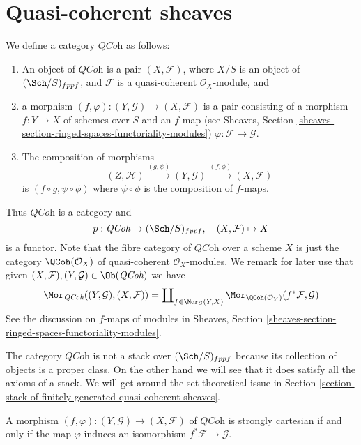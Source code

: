 \section{Quasi-coherent sheaves}
\label{section-stack-of-quasi-coherent-sheaves}

\noindent
We define a category $\textit{QCoh}$ as follows:
\begin{enumerate}
\item An object of $\textit{QCoh}$ is a pair $(X, \mathcal{F})$,
where $X/S$ is an object of $(\Sch/S)_{fppf}$, and $\mathcal{F}$
is a quasi-coherent $\mathcal{O}_X$-module, and
\item a morphism $(f, \varphi) : (Y, \mathcal{G}) \to (X, \mathcal{F})$
is a pair consisting of a morphism $f : Y \to X$ of schemes over $S$
and an $f$-map (see
Sheaves, Section \ref{sheaves-section-ringed-spaces-functoriality-modules})
$\varphi : \mathcal{F} \to \mathcal{G}$.
\item The composition of morphisms
$$
(Z, \mathcal{H}) \xrightarrow{(g, \psi)}
(Y, \mathcal{G}) \xrightarrow{(f, \phi)} (X, \mathcal{F})
$$
is $(f \circ g, \psi \circ \phi)$ where $\psi \circ \phi$ is
the composition of $f$-maps.
\end{enumerate}
Thus $\textit{QCoh}$ is a category and
$$
p : \textit{QCoh} \to (\Sch/S)_{fppf},
\quad
(X, \mathcal{F}) \mapsto X
$$
is a functor. Note that the fibre category of $\textit{QCoh}$ over
a scheme $X$ is just the category $\QCoh(\mathcal{O}_X)$
of quasi-coherent $\mathcal{O}_X$-modules.
We remark for later use that given
$(X, \mathcal{F}), (Y, \mathcal{G}) \in \Ob(\textit{QCoh})$
we have
\begin{equation}
\label{equation-morphisms-qcoh}
\Mor_{\textit{QCoh}}((Y, \mathcal{G}), (X, \mathcal{F}))
=
\coprod\nolimits_{f \in \Mor_S(Y, X)}
\Mor_{\QCoh(\mathcal{O}_Y)}(f^*\mathcal{F}, \mathcal{G})
\end{equation}
See the discussion on $f$-maps of modules in
Sheaves, Section \ref{sheaves-section-ringed-spaces-functoriality-modules}.

\medskip\noindent
The category $\textit{QCoh}$ is not a stack over $(\Sch/S)_{fppf}$
because its collection of objects is a proper class. On the other hand
we will see that it does satisfy all the axioms of a stack. We will
get around the set theoretical issue in
Section \ref{section-stack-of-finitely-generated-quasi-coherent-sheaves}.

\begin{lemma}
\label{lemma-quasi-coherent-strongly-cartesian}
A morphism $(f, \varphi) : (Y, \mathcal{G}) \to (X, \mathcal{F})$
of $\textit{QCoh}$ is strongly cartesian if and only if the
map $\varphi$ induces an isomorphism $f^*\mathcal{F} \to \mathcal{G}$.
\end{lemma}

